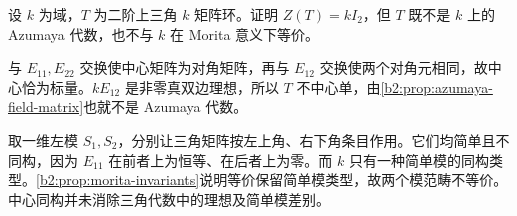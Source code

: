 \begin{exercise}\label{b2:ex:C-morita-center-not-enough}
	设 \(k\) 为域，\(T\) 为二阶上三角 \(k\) 矩阵环。证明 \(Z(T)=kI_2\)，但 \(T\) 既不是 \(k\) 上的 Azumaya 代数，也不与 \(k\) 在 Morita 意义下等价。
\end{exercise}
\begin{solution}
	与 \(E_{11},E_{22}\) 交换使中心矩阵为对角矩阵，再与 \(E_{12}\) 交换使两个对角元相同，故中心恰为标量。\(kE_{12}\) 是非零真双边理想，所以 \(T\) 不中心单，由\cref{b2:prop:azumaya-field-matrix}也就不是 Azumaya 代数。

	取一维左模 \(S_1,S_2\)，分别让三角矩阵按左上角、右下角条目作用。它们均简单且不同构，因为 \(E_{11}\) 在前者上为恒等、在后者上为零。而 \(k\) 只有一种简单模的同构类型。\cref{b2:prop:morita-invariants}说明等价保留简单模类型，故两个模范畴不等价。中心同构并未消除三角代数中的理想及简单模差别。
\end{solution}
